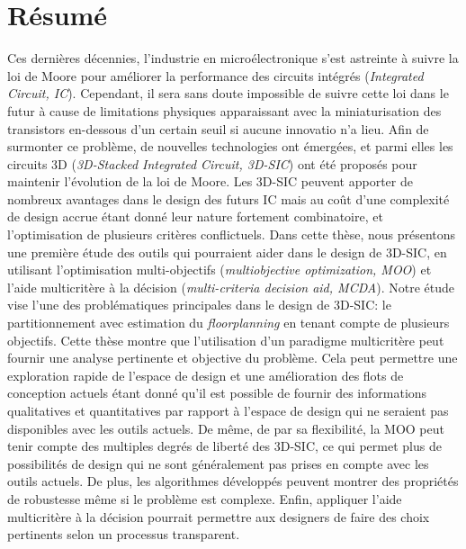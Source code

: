 \chapter[R\'esum\'e (French Summary)]{R\'esum\'e}

\vspace{-0.5in}

Ces dernières décennies, l'industrie en microélectronique s'est astreinte à suivre la loi de Moore pour améliorer la performance des circuits intégrés (\textit{Integrated Circuit, IC}). Cependant, il sera sans doute impossible de suivre cette loi dans le futur à cause de limitations physiques apparaissant avec la miniaturisation des transistors en-dessous d'un certain seuil si aucune innovatio n'a lieu. Afin de surmonter ce problème, de nouvelles technologies ont émergées, et parmi elles les circuits 3D (\textit{3D-Stacked Integrated Circuit, 3D-SIC}) ont été proposés pour maintenir l'évolution de la loi de Moore. Les 3D-SIC peuvent apporter de nombreux avantages dans le design des futurs IC mais au coût d'une complexité de design accrue étant donné leur nature fortement combinatoire, et l'optimisation de plusieurs critères conflictuels. Dans cette thèse, nous présentons une première étude des outils qui pourraient aider dans le design de 3D-SIC, en utilisant l'optimisation multi-objectifs (\textit{multiobjective optimization, MOO}) et l'aide multicritère à la décision (\textit{multi-criteria decision aid, MCDA}). Notre étude vise l'une des problématiques principales dans le design de 3D-SIC: le partitionnement avec estimation du \textit{floorplanning} en tenant compte de plusieurs objectifs. Cette thèse montre que l'utilisation d'un paradigme multicritère peut fournir une analyse pertinente et objective du problème. Cela peut permettre une exploration rapide de l'espace de design et une amélioration des flots de conception actuels étant donné qu'il est possible de fournir des informations qualitatives et quantitatives par rapport à l'espace de design qui ne seraient pas disponibles avec les outils actuels. De même, de par sa flexibilité, la MOO peut tenir compte des multiples degrés de liberté des 3D-SIC, ce qui permet plus de possibilités de design qui ne sont généralement pas prises en compte avec les outils actuels. De plus, les algorithmes développés peuvent montrer des propriétés de robustesse même si le problème est complexe. Enfin, appliquer l'aide multicritère à la décision pourrait permettre aux designers de faire des choix pertinents selon un processus transparent.